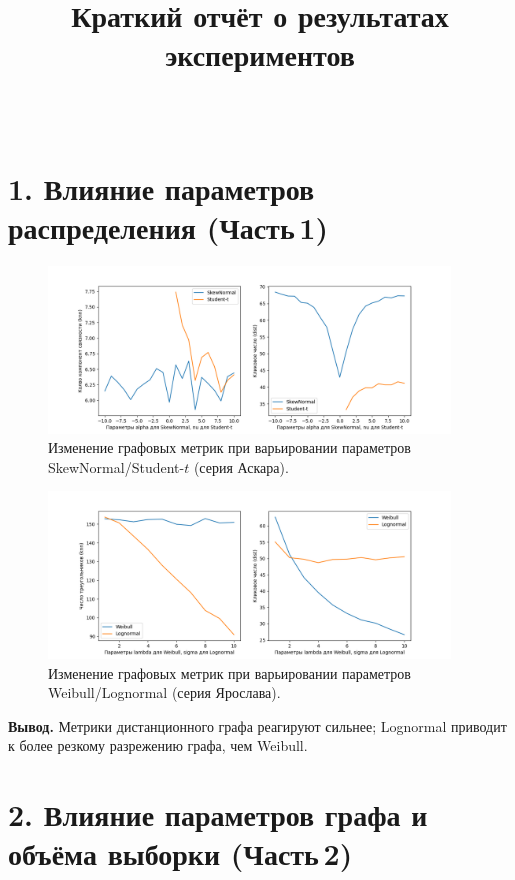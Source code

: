 \documentclass[a4paper,12pt]{article}
\title{Краткий отчёт о результатах экспериментов}
\author{~}
\date{}
\begin{document}
\maketitle

\section*{1. Влияние параметров распределения (Часть\,1)}

\begin{figure}[H]
    \centering
    \includegraphics[width=0.95\textwidth]{part1_results_Askar.png}
    \caption{Изменение графовых метрик при варьировании параметров SkewNormal/Student-$t$ (серия Аскара).}
    \label{fig:part1-askar}
\end{figure}

\begin{figure}[H]
    \centering
    \includegraphics[width=0.95\textwidth]{part1_results_Yaroslav.png}
    \caption{Изменение графовых метрик при варьировании параметров Weibull/Lognormal (серия Ярослава).}
    \label{fig:part1-yaroslav}
\end{figure}

\noindent\textbf{Вывод.} Метрики дистанционного графа реагируют сильнее; Lognormal приводит к более резкому разрежению графа, чем Weibull.

\section*{2. Влияние параметров графа и объёма выборки (Часть\,2)}
\end{document}
